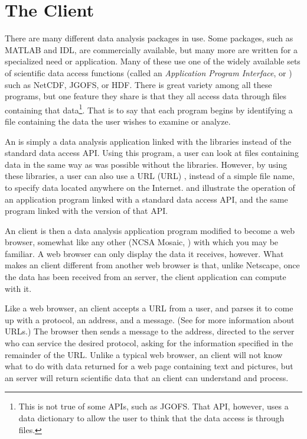 %
%

\chapter{The \opendap Client}
\label{opd-client}

There are many different data analysis packages in use. Some packages, such
as MATLAB and IDL, are commercially available, but many more are written for
a specialized need or application. Many of these use one of the widely
available sets of scientific data access functions (called an {\em
  Application Program Interface}, or ) such as NetCDF, JGOFS, or HDF. There is great variety
among all these programs, but one feature they share is that they all access
data through files containing that data\footnote{This is not true of some
  APIs, such as JGOFS.  That API, however, uses a data dictionary to allow
  the user to think that the data access is through files.}.  That is to say
that each program begins by identifying a file containing the data the user
wishes to examine or analyze.

An   is simply a data
analysis application linked with the \opendap libraries instead of the
standard data access API. Using this program, a user can look at files
containing data in the same way as was possible without the \opendap
libraries.  However, by using these libraries, a user can also use a
URL (URL) , instead
of a simple file name, to specify data located anywhere on the
Internet.   and
 illustrate the operation of an
application program linked with a standard data access API, and the
same program linked with the \opendap version of that API.

An \opendap client is then a data analysis application program
modified to become a web browser, somewhat like any other  (NCSA Mosaic, ) with
which you may be familiar. A web browser can only display the data it
receives, however. What makes an \opendap client different from
another web browser is that, unlike Netscape, once the data has been
received from an \opendap server, the \opendap client application can
compute with it.

Like a web browser, an \opendap client accepts a URL from a user, and
parses it to come up with a protocol, an address, and a message. (See
 for more information about URLs.) The
browser then sends a message to the address, directed to the server
who can service the desired protocol, asking for the information
specified in the remainder of the URL. Unlike a typical web browser, an \opendap client will not know what to do with data returned for a web page
containing text and pictures, but an \opendap server will return scientific
data that an \opendap client can understand and process.

